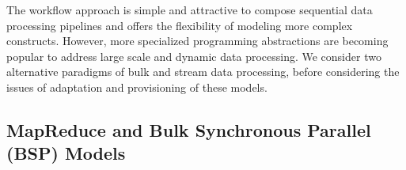 

The workflow approach is simple and attractive to compose sequential data processing pipelines and
offers the flexibility of modeling more complex constructs. However, more specialized programming
abstractions are becoming popular to address large scale and dynamic data processing.
We consider two alternative paradigms of bulk and stream data processing, before considering the
issues of adaptation and provisioning of these models.

\subsection{MapReduce and Bulk Synchronous Parallel (BSP) Models}



